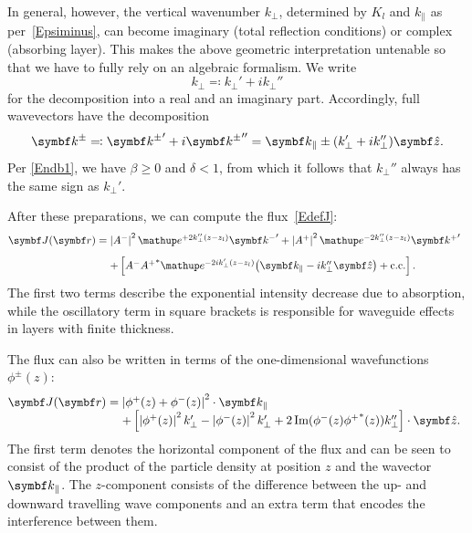 In general, however, the vertical wavenumber $k_{\perp}$,
determined by $K_l$ and $k_\parallel$ as per~\cref{Epsiminus},
can become imaginary (total reflection conditions) or complex (absorbing layer).
%
This makes the above geometric interpretation untenable
so that we have to fully rely on an algebraic formalism.
We write
\begin{equation}\label{Edecompkperp}
  k_\perp \eqqcolon k_\perp' + i k_\perp''
\end{equation}
for the decomposition into a real and an imaginary part.
Accordingly, full wavevectors have the decomposition
\begin{equation}
  \k^\pm
  \eqqcolon {\k^\pm}' + i{\k^\pm}''
  = \k_\plll \pm (k_\perp' + i k_\perp'')\v{\hat z}.
\end{equation}
Per \cref{Endb1}, we have $\beta\ge0$ and $\delta<1$,
from which it follows that $k_\perp''$ always has the same sign as $k_\perp'$.

After these preparations,
we can compute the flux~\cref{EdefJ}:
\begin{equation}
  \begin{array}{@{}l@{\;}l}
  \v{J}(\r)
  =&   \left|A^-\right|^2 \e^{+2k_\perp'' (z-z_l)} {\k^-}'
    + \left|A^+\right|^2 \e^{-2k_\perp''(z-z_l)} {\k^+}'
\\[2ex]
  &+ \left[
      A^-{A^+}^* \e^{-2ik_\perp'(z-z_l)} {\left(\k_\plll-ik_\perp''\v{\hat z}\right)}
    + \text{c.c.}
    \right].
  \end{array}
\end{equation}
The first two terms describe the exponential intensity decrease
due to absorption, while
the oscillatory term in square brackets
is responsible for waveguide effects in layers with finite thickness.

The flux can also be written in terms of the one-dimensional wavefunctions $\phi^{\pm}(z)$:
\begin{equation}
  \begin{array}{@{}l@{\;}l}
  \v{J}(\r) =& \left|\phi^+(z)+\phi^-(z)\right|^2\cdot\k_\plll \\
  &+ \left[ \left|\phi^+(z)\right|^2 k_\perp' - \left|\phi^-(z)\right|^2 k_\perp' +
  2\Im(\phi^-(z){\phi^+}^*(z))k_\perp'' \right]\cdot \v{\hat z}.
  \end{array}
\end{equation}
The first term denotes the horizontal component
of the flux and can be seen to consist of the product
of the particle density at position $z$ and the wavector $\k_\plll$.
The $z$-component consists of the difference
between the up- and downward travelling wave components
and an extra term that encodes the interference between them.

